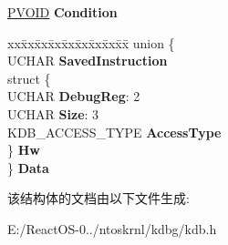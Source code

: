 \begin{DoxyCompactItemize}
\hyperlink{interfacevoid}{P\+V\+O\+ID} {\bfseries Condition}
\item 
\mbox{\label{struct___k_d_b___b_r_e_a_k_p_o_i_n_t_af3dc08ad7e06dd60058fb8ebb6176661}} 
\begin{tabbing}
xx\=xx\=xx\=xx\=xx\=xx\=xx\=xx\=xx\=\kill
union \{\\
\>UCHAR {\bfseries SavedInstruction}\\
\>struct \{\\
\>\>UCHAR {\bfseries DebugReg}: 2\\
\>\>UCHAR {\bfseries Size}: 3\\
\>\>KDB\_ACCESS\_TYPE {\bfseries AccessType}\\
\>\} {\bfseries Hw}\\
\} {\bfseries Data}\\

\end{tabbing}\end{DoxyCompactItemize}


该结构体的文档由以下文件生成\+:\begin{DoxyCompactItemize}
\item 
E\+:/\+React\+O\+S-\/0../ntoskrnl/kdbg/kdb.\+h\end{DoxyCompactItemize}
